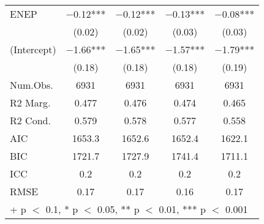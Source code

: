 \begin{table}
\begin{tabular}[t]{lcccc}
ENEP & \num{-0.12}*** & \num{-0.12}*** & \num{-0.13}*** & \num{-0.08}***\\
 & (\num{0.02}) & (\num{0.02}) & (\num{0.03}) & (\num{0.03})\\
(Intercept) & \num{-1.66}*** & \num{-1.65}*** & \num{-1.57}*** & \num{-1.79}***\\
 & (\num{0.18}) & (\num{0.18}) & (\num{0.18}) & (\num{0.19})\\
\midrule
Num.Obs. & \num{6931} & \num{6931} & \num{6931} & \num{6931}\\
R2 Marg. & \num{0.477} & \num{0.476} & \num{0.474} & \num{0.465}\\
R2 Cond. & \num{0.579} & \num{0.578} & \num{0.577} & \num{0.558}\\
AIC & \num{1653.3} & \num{1652.6} & \num{1652.4} & \num{1622.1}\\
BIC & \num{1721.7} & \num{1727.9} & \num{1741.4} & \num{1711.1}\\
ICC & \num{0.2} & \num{0.2} & \num{0.2} & \num{0.2}\\
RMSE & \num{0.17} & \num{0.17} & \num{0.16} & \num{0.17}\\
\bottomrule
\multicolumn{5}{l}{\rule{0pt}{1em}+ p $<$ 0.1, * p $<$ 0.05, ** p $<$ 0.01, *** p $<$ 0.001}\\
\end{tabular}
\end{table}
